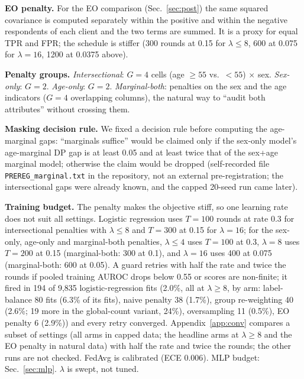 \documentclass[conference]{IEEEtran}
\begin{document}
\textbf{EO penalty.} For the EO comparison (Sec.~\ref{sec:post}) the same squared covariance is computed separately within the positive and within the negative respondents of each client and the two terms are summed. It is a proxy for equal TPR and FPR; the schedule is stiffer (300 rounds at 0.15 for $\lambda\le8$, 600 at 0.075 for $\lambda{=}16$, 1200 at 0.0375 above).

\textbf{Penalty groups.} \emph{Intersectional}: $G{=}4$ cells (age $\ge55$ vs.\ $<55$) $\times$ sex. \emph{Sex-only}: $G{=}2$. \emph{Age-only}: $G{=}2$. \emph{Marginal-both}: penalties on the sex and the age indicators ($G{=}4$ overlapping columns), the natural way to ``audit both attributes'' without crossing them.

\textbf{Masking decision rule.} We fixed a decision rule before computing the age-marginal gaps: ``marginals suffice'' would be claimed only if the sex-only model's age-marginal DP gap is at least 0.05 and at least twice that of the sex+age marginal model; otherwise the claim would be dropped (self-recorded file \texttt{PREREG\_marginal.txt} in the repository, not an external pre-registration; the intersectional gaps were already known, and the capped 20-seed run came later).

\textbf{Training budget.} The penalty makes the objective stiff, so one learning rate does not suit all settings. Logistic regression uses $T{=}100$ rounds at rate 0.3 for intersectional penalties with $\lambda\le8$ and $T{=}300$ at 0.15 for $\lambda{=}16$; for the sex-only, age-only and marginal-both penalties, $\lambda\le4$ uses $T{=}100$ at 0.3, $\lambda{=}8$ uses $T{=}200$ at 0.15 (marginal-both: 300 at 0.1), and $\lambda{=}16$ uses 400 at 0.075 (marginal-both: 600 at 0.05). A guard retries with half the rate and twice the rounds if pooled training AUROC drops below 0.55 or scores are non-finite; it fired in 194 of 9,835 logistic-regression fits (2.0\%, all at $\lambda\ge8$, by arm: label-balance 80 fits (6.3\% of its fits), naive penalty 38 (1.7\%), group re-weighting 40 (2.6\%; 19 more in the global-count variant, 24\%), oversampling 11 (0.5\%), EO penalty 6 (2.9\%)) and every retry converged. Appendix~\ref{app:conv} compares a subset of settings (all arms in capped data; the headline arms at $\lambda\ge8$ and the EO penalty in natural data) with half the rate and twice the rounds; the other runs are not checked. FedAvg is calibrated (ECE 0.006). MLP budget: Sec.~\ref{sec:mlp}. $\lambda$ is swept, not tuned.
\end{document}
